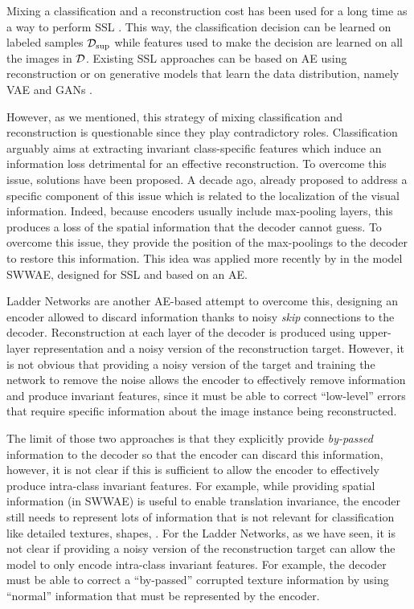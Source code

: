 Mixing a classification and a reconstruction cost has been used for a long time as a way to perform \ac{SSL} \citep[\eg\unskip][]{Ranzato2008}. This way, the classification decision can be learned on labeled samples $\mathcal{D}_\mathrm{sup}$ while features used to make the decision are learned on all the images in $\mathcal{D}$. Existing \ac{SSL} approaches can be based on \ac{AE} using reconstruction \citep{Weston2008,turian2010word} or on generative models that learn the data distribution, namely \ac{VAE} \citep{Kingma2014} and \acp{GAN} \citep{Springenberg2015,Denton2017,Bodla2018}.

However, as we mentioned, this strategy of mixing classification and reconstruction is questionable since they play contradictory roles. Classification arguably aims at extracting invariant class-specific features which induce an information loss detrimental for an effective reconstruction.
To overcome this issue, solutions have been proposed. A decade ago, \citet{Ranzato2007b} already proposed to address a specific component of this issue which is related to the localization of the visual information. Indeed, because encoders usually include max-pooling layers, this produces a loss of the spatial information that the decoder cannot guess. To overcome this issue, they provide the position of the max-poolings to the decoder to restore this information. This idea was applied more recently by \citet{Zhao2016a} in the model \acf{SWWAE}, designed for \ac{SSL} and based on an \ac{AE}.

Ladder Networks \citep{Rasmus2015} are another \ac{AE}-based attempt to overcome this, designing an encoder allowed to discard information thanks to noisy \textit{skip} connections to the decoder. Reconstruction at each layer of the decoder is produced using upper-layer representation and a noisy version of the reconstruction target. However, it is not obvious that providing a noisy version of the target and training the network to remove the noise allows the encoder to effectively remove information and produce invariant features, since it must be able to correct ``low-level'' errors that require specific information about the image instance being reconstructed.

The limit of those two approaches is that they explicitly provide \textit{by-passed} information to the decoder so that the encoder can discard this information, however, it is not clear if this is sufficient to allow the encoder to effectively produce intra-class invariant features. For example, while providing spatial information (in \ac{SWWAE}) is useful to enable translation invariance, the encoder still needs to represent lots of information that is not relevant for classification like detailed textures, shapes, \etc. For the Ladder Networks, as we have seen, it is not clear if providing a noisy version of the reconstruction target can allow the model to only encode intra-class invariant features. For example, the decoder must be able to correct a ``by-passed'' corrupted texture information by using ``normal'' information that must be represented by the encoder.

